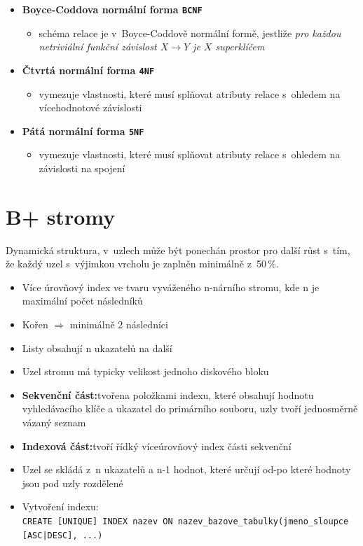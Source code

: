 \documentclass[a4paper,10pt]{article}
\newcommand{\pojem}[2]{\item \textbf{#1:}\quad #2}
\newcommand{\tedy}{$\Rightarrow$ }
\begin{document}
\begin{itemize}
        \item \textbf{Boyce-Coddova normální forma \texttt{BCNF}}
        \begin{itemize}
          \item schéma relace je v~Boyce-Coddově normální formě, jestliže \emph{pro každou netriviální funkční závislost $X \rightarrow Y$ je $X$ superklíčem}
        \end{itemize}

        \item \textbf{Čtvrtá normální forma \texttt{4NF}}
        \begin{itemize}
          \item vymezuje vlastnosti, které musí splňovat atributy relace s~ohledem na vícehodnotové závislosti
        \end{itemize}

        \item \textbf{Pátá normální forma \texttt{5NF}}
        \begin{itemize}
          \item vymezuje vlastnosti, které musí splňovat atributy relace s~ohledem na závislosti na spojení
        \end{itemize}
      \end{itemize}

  \section{B+ stromy}
  Dynamická struktura, v~uzlech může být ponechán prostor pro další růst s~tím, že každý uzel s~výjimkou vrcholu je zaplněn minimálně z~50\,\%.
  \begin{itemize}
    \item Více úrovňový index ve tvaru vyváženého n-nárního stromu, kde n je maximální počet následníků
    \item Kořen \tedy minimálně 2 následníci
    \item Listy obsahují n ukazatelů na další
    \item Uzel stromu má typicky velikost jednoho diskového bloku
    \pojem{Sekvenční část}{tvořena položkami indexu, které obsahují hodnotu vyhledávacího klíče a ukazatel do primárního souboru, uzly tvoří jednosměrně vázaný seznam}
    \pojem{Indexová část}{tvoří řídký víceúrovňový index části sekvenční}
    \item Uzel se skládá z~n ukazatelů a n-1 hodnot, které určují od-po které hodnoty jsou pod uzly rozdělené
    \item Vytvoření indexu: \\ \texttt{CREATE [UNIQUE] INDEX nazev ON nazev\_bazove\_tabulky(jmeno\_sloupce [ASC|DESC], ...)}
  \end{itemize}
\end{document}
